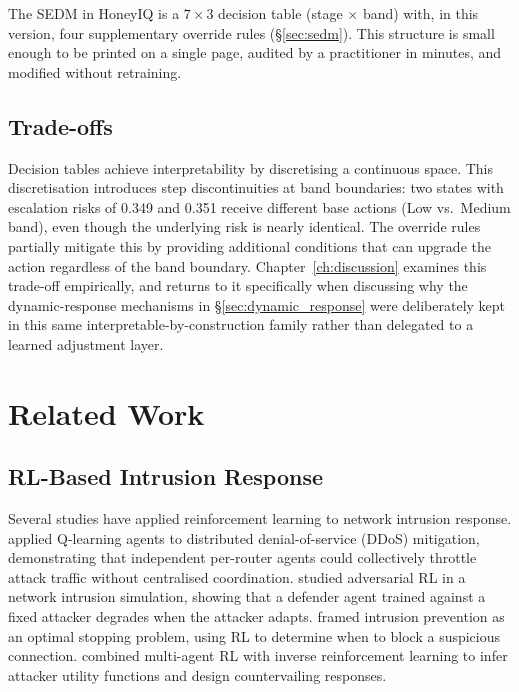 The SEDM in HoneyIQ is a $7 \times 3$ decision table (stage $\times$ band)
with, in this version, four supplementary override rules
(\S\ref{sec:sedm}).
This structure is small enough to be printed on a single page, audited by
a practitioner in minutes, and modified without retraining.

\subsection{Trade-offs}

Decision tables achieve interpretability by discretising a continuous space.
This discretisation introduces step discontinuities at band boundaries:
two states with escalation risks of 0.349 and 0.351 receive different base
actions (Low vs.\ Medium band), even though the underlying risk is nearly
identical.
The override rules partially mitigate this by providing additional conditions
that can upgrade the action regardless of the band boundary.
Chapter~\ref{ch:discussion} examines this trade-off empirically, and returns
to it specifically when discussing why the dynamic-response mechanisms in
\S\ref{sec:dynamic_response} were deliberately kept in this same
interpretable-by-construction family rather than delegated to a learned
adjustment layer.

\section{Related Work}
\label{sec:bg_related}

\subsection{RL-Based Intrusion Response}

Several studies have applied reinforcement learning to network intrusion
response.
\citet{malialis2015distributed} applied Q-learning agents to distributed
denial-of-service (DDoS) mitigation, demonstrating that independent
per-router agents could collectively throttle attack traffic without
centralised coordination.
\citet{elderman2017adversarial} studied adversarial RL in a network
intrusion simulation, showing that a defender agent trained against a fixed
attacker degrades when the attacker adapts.
\citet{hammar2021learning} framed intrusion prevention as an optimal stopping
problem, using RL to determine when to block a suspicious connection.
\citet{li2019mad} combined multi-agent RL with inverse reinforcement learning
to infer attacker utility functions and design countervailing responses.

